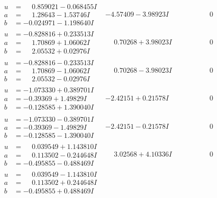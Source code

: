 \documentclass[1p]{elsarticle_modified}
\theoremstyle{definition}
\begin{document}
$$\begin{array}{c|c|c}
\begin{aligned}
u &= \phantom{-}0.859021 - 0.068455 I \\
a &= \phantom{-}1.28643 - 1.53746 I \\
b &= -0.024971 - 1.198640 I\end{aligned}
 & -4.57409 - 3.98923 I & \phantom{-0.000000 } 0 \\ \hline\begin{aligned}
u &= -0.828816 + 0.233513 I \\
a &= \phantom{-}1.70869 + 1.06062 I \\
b &= \phantom{-}2.05532 + 0.02976 I\end{aligned}
 & \phantom{-}0.70268 + 3.98023 I & \phantom{-0.000000 } 0 \\ \hline\begin{aligned}
u &= -0.828816 - 0.233513 I \\
a &= \phantom{-}1.70869 - 1.06062 I \\
b &= \phantom{-}2.05532 - 0.02976 I\end{aligned}
 & \phantom{-}0.70268 - 3.98023 I & \phantom{-0.000000 } 0 \\ \hline\begin{aligned}
u &= -1.073330 + 0.389701 I \\
a &= -0.39369 + 1.49829 I \\
b &= -0.128585 + 1.390040 I\end{aligned}
 & -2.42151 + 0.21578 I & \phantom{-0.000000 } 0 \\ \hline\begin{aligned}
u &= -1.073330 - 0.389701 I \\
a &= -0.39369 - 1.49829 I \\
b &= -0.128585 - 1.390040 I\end{aligned}
 & -2.42151 - 0.21578 I & \phantom{-0.000000 } 0 \\ \hline\begin{aligned}
u &= \phantom{-}0.039549 + 1.143810 I \\
a &= \phantom{-}0.113502 - 0.244648 I \\
b &= -0.495855 - 0.488469 I\end{aligned}
 & \phantom{-}3.02568 + 4.10336 I & \phantom{-0.000000 } 0 \\ \hline\begin{aligned}
u &= \phantom{-}0.039549 - 1.143810 I \\
a &= \phantom{-}0.113502 + 0.244648 I \\
b &= -0.495855 + 0.488469 I\end{aligned}

\end{array}$$
\end{document}
